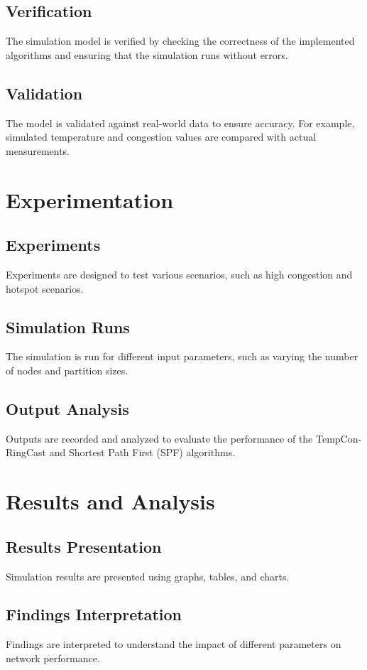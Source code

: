 \documentclass[12pt]{article}
\begin{document}
\subsection{Verification}
The simulation model is verified by checking the correctness of the implemented algorithms and ensuring that the simulation runs without errors.

\subsection{Validation}
The model is validated against real-world data to ensure accuracy. For example, simulated temperature and congestion values are compared with actual measurements.

\section{Experimentation}
\subsection{Experiments}
Experiments are designed to test various scenarios, such as high congestion and hotspot scenarios.

\subsection{Simulation Runs}
The simulation is run for different input parameters, such as varying the number of nodes and partition sizes.

\subsection{Output Analysis}
Outputs are recorded and analyzed to evaluate the performance of the TempCon-RingCast and Shortest Path First (SPF) algorithms.

\section{Results and Analysis}
\subsection{Results Presentation}
Simulation results are presented using graphs, tables, and charts.

\subsection{Findings Interpretation}
Findings are interpreted to understand the impact of different parameters on network performance.
\end{document}
